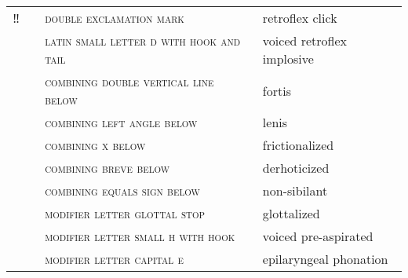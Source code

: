 \label{tab:ipa_additions}
 \tablelasttail{\bottomrule}

\begin{center}
\begin{xtabular}{ l L{1.2cm} L{6.1cm} L{3.5cm} }
‼ &  & \textsc{double exclamation mark} & retroflex click \\
 &  & \textsc{latin small letter d with hook and tail} & voiced retroflex implosive \\
 &  & \textsc{combining double vertical line below} & fortis \\
 &  & \textsc{combining left angle below} & lenis \\
 &  & \textsc{combining x below} & frictionalized \\
 &  & \textsc{combining breve below} & derhoticized \\
 &  & \textsc{combining equals sign below} & non-sibilant \\
 &  & \textsc{modifier letter glottal stop} & glottalized \\
 &  & \textsc{modifier letter small h with hook} & voiced pre-aspirated \\
 &  & \textsc{modifier letter capital e} & epilaryngeal phonation \\
\end{xtabular}
\end{center}